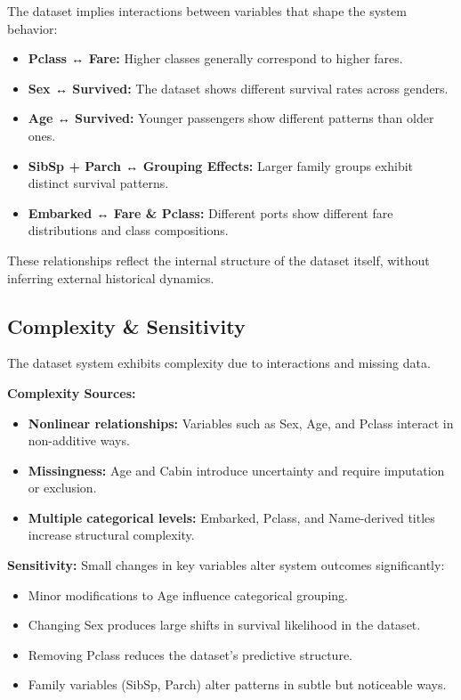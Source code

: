 \documentclass[12pt]{report}
\begin{document}
The dataset implies interactions between variables that shape the system behavior:

\begin{itemize}
    \item \textbf{Pclass ↔ Fare:} Higher classes generally correspond to higher fares.
    \item \textbf{Sex ↔ Survived:} The dataset shows different survival rates across genders.
    \item \textbf{Age ↔ Survived:} Younger passengers show different patterns than older ones.
    \item \textbf{SibSp + Parch ↔ Grouping Effects:} Larger family groups exhibit distinct survival patterns.
    \item \textbf{Embarked ↔ Fare \& Pclass:} Different ports show different fare distributions and class compositions.
\end{itemize}

These relationships reflect the internal structure of the dataset itself, without inferring external historical dynamics.

\subsection*{Complexity \& Sensitivity}

The dataset system exhibits complexity due to interactions and missing data.

\textbf{Complexity Sources:}
\begin{itemize}
    \item \textbf{Nonlinear relationships:}  
    Variables such as Sex, Age, and Pclass interact in non-additive ways.
    \item \textbf{Missingness:}  
    Age and Cabin introduce uncertainty and require imputation or exclusion.
    \item \textbf{Multiple categorical levels:}  
    Embarked, Pclass, and Name-derived titles increase structural complexity.
\end{itemize}

\textbf{Sensitivity:}  
Small changes in key variables alter system outcomes significantly:
\begin{itemize}
    \item Minor modifications to Age influence categorical grouping.
    \item Changing Sex produces large shifts in survival likelihood in the dataset.
    \item Removing Pclass reduces the dataset's predictive structure.
    \item Family variables (SibSp, Parch) alter patterns in subtle but noticeable ways.
\end{itemize}
\end{document}
